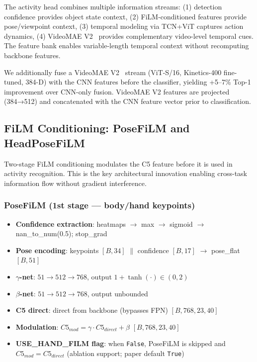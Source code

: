 \documentclass[11pt,a4paper]{article}
\begin{document}
The activity head combines multiple information streams: (1) detection confidence provides object state context, (2) FiLM-conditioned features provide pose/viewpoint context, (3) temporal modeling via TCN+ViT captures action dynamics, (4) VideoMAE V2~\cite{wang2023videomae} provides complementary video-level temporal cues. The feature bank enables variable-length temporal context without recomputing backbone features.

We additionally fuse a VideoMAE V2~\cite{wang2023videomae} stream (ViT-S/16, Kinetics-400 fine-tuned, 384-D) with the CNN features before the classifier, yielding +5--7\% Top-1 improvement over CNN-only fusion. VideoMAE V2 features are projected (384→512) and concatenated with the CNN feature vector prior to classification.

\subsection{FiLM Conditioning: PoseFiLM and HeadPoseFiLM}

Two-stage FiLM conditioning modulates the C5 feature before it is used in activity recognition. This is the key architectural innovation enabling cross-task information flow without gradient interference.

\subsubsection{PoseFiLM (1st stage --- body/hand keypoints)}
\begin{itemize}
\item \textbf{Confidence extraction}: heatmaps $\rightarrow$ max $\rightarrow$ sigmoid $\rightarrow$ nan\_to\_num(0.5); stop\_grad
\item \textbf{Pose encoding}: keypoints $[B, 34]$ $\|$ confidence $[B, 17]$ $\rightarrow$ pose\_flat $[B, 51]$
\item \textbf{$\gamma$-net}: $51 \rightarrow 512 \rightarrow 768$, output $1 + \tanh(\cdot) \in (0, 2)$
\item \textbf{$\beta$-net}: $51 \rightarrow 512 \rightarrow 768$, output unbounded
\item \textbf{C5 direct}: direct from backbone (bypasses FPN) $[B, 768, 23, 40]$
\item \textbf{Modulation}: $C5_{mod} = \gamma \cdot C5_{direct} + \beta$ $[B, 768, 23, 40]$
\item \textbf{USE\_HAND\_FILM flag}: when \texttt{False}, PoseFiLM is skipped and $C5_{mod}=C5_{direct}$ (ablation support; paper default \texttt{True})
\end{itemize}
\end{document}
